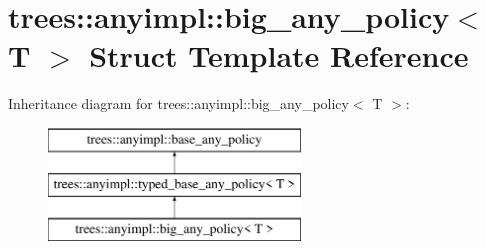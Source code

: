 \hypertarget{structtrees_1_1anyimpl_1_1big__any__policy}{}\section{trees\+:\+:anyimpl\+:\+:big\+\_\+any\+\_\+policy$<$ T $>$ Struct Template Reference}
\label{structtrees_1_1anyimpl_1_1big__any__policy}
Inheritance diagram for trees\+:\+:anyimpl\+:\+:big\+\_\+any\+\_\+policy$<$ T $>$\+:\begin{figure}[H]
\begin{center}
\leavevmode
\includegraphics[height=3.000000cm]{structtrees_1_1anyimpl_1_1big__any__policy}
\end{center}
\end{figure}
